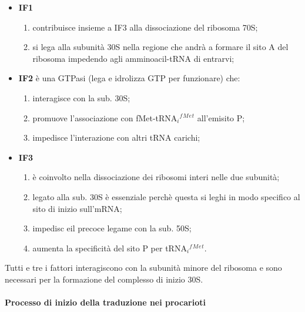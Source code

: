 \documentclass[11pt]{book}
\begin{document}
\begin{itemize}
\itemsep1pt\parskip0pt
\item
  \textbf{IF1}

  \begin{enumerate}
  \def\labelenumi{\arabic{enumi}.}
  \itemsep1pt\parskip0pt
  \item
    contribuisce insieme a IF3 alla dissociazione del ribosoma 70S;
  \item
    si lega alla subunità 30S nella regione che andrà a formare il sito
    A del ribosoma impedendo agli amminoacil-tRNA di entrarvi;
  \end{enumerate}
\item
  \textbf{IF2} è una GTPasi (lega e idrolizza GTP per funzionare) che:

  \begin{enumerate}
  \def\labelenumi{\arabic{enumi}.}
  \itemsep1pt\parskip0pt
  \item
    interagisce con la sub. 30S;
  \item
    promuove l'associazione con fMet-tRNA\(_i\)\(^f\)\(^M\)\(^e\)\(^t\)
    all'emisito P;
  \item
    impedisce l'interazione con altri tRNA carichi;
  \end{enumerate}
\item
  \textbf{IF3}

  \begin{enumerate}
  \def\labelenumi{\arabic{enumi}.}
  \itemsep1pt\parskip0pt
  \item
    è coinvolto nella dissociazione dei ribosomi interi nelle due
    subunità;
  \item
    legato alla sub. 30S è essenziale perchè questa si leghi in modo
    specifico al sito di inizio sull'mRNA;
  \item
    impedisc eil precoce legame con la sub. 50S;
  \item
    aumenta la specificità del sito P per
    tRNA\(_i\)\(^f\)\(^M\)\(^e\)\(^t\).
  \end{enumerate}
\end{itemize}

Tutti e tre i fattori interagiscono con la subunità minore del ribosoma
e sono necessari per la formazione del complesso di inizio 30S.

\paragraph{Processo di inizio della traduzione nei
procarioti}\label{processo-di-inizio-della-traduzione-nei-procarioti}
\end{document}
